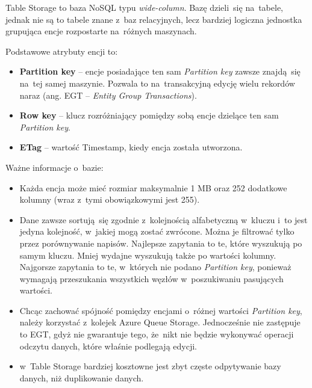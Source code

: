 \documentclass[12pt,a4paper,twoside,titlepage,openright]{book}
\begin{document}
Table Storage to baza NoSQL typu \textit{wide-column}.
Bazę dzieli~się na~tabele, jednak nie są to tabele znane z~baz relacyjnych, lecz bardziej logiczna jednostka grupująca encje rozpostarte na~różnych maszynach.

Podstawowe atrybuty encji to: \cite{siteAppTableDeisgnGuide}
\begin{itemize}
\item \textbf{Partition key} -- encje posiadające ten sam \textit{Partition key} zawsze znajdą~się na~tej samej maszynie. Pozwala to na~transakcyjną edycję wielu rekordów naraz (ang. EGT -- \textit{Entity Group Transactions}).
\item \textbf{Row key} -- klucz rozróżniający pomiędzy sobą encje dzielące ten sam \textit{Partition key}. 
\item \textbf{ETag} -- wartość Timestamp, kiedy encja została utworzona.
\end{itemize}
Ważne informacje o~bazie: \cite{siteAppTableDeisgnGuide}
\begin{itemize}
\item Każda encja może mieć rozmiar maksymalnie 1 MB oraz 252 dodatkowe kolumny (wraz z~tymi obowiązkowymi jest 255).
\item Dane zawsze sortują~się zgodnie z~kolejnością alfabetyczną w~kluczu i~to jest jedyna kolejność, w~jakiej mogą zostać zwrócone. Można je filtrować tylko przez porównywanie napisów. Najlepsze zapytania to te, które wyszukują po samym kluczu. Mniej wydajne wyszukują także po wartości kolumny. Najgorsze zapytania to te, w~których nie podano \textit{Partition key}, ponieważ wymagają przeszukania wszystkich węzłów w~poszukiwaniu pasujących wartości. \cite{siteAppQuery}
\item Chcąc zachować spójność pomiędzy encjami o~różnej wartości \textit{Partition key}, należy korzystać z~kolejek Azure Queue Storage. Jednocześnie nie zastępuje to EGT, gdyż nie gwarantuje tego, że~nikt nie będzie wykonywać operacji odczytu danych, które właśnie podlegają edycji.
\item w~Table Storage bardziej kosztowne jest zbyt częste odpytywanie bazy danych, niż duplikowanie danych.
\end{itemize}
\end{document}

